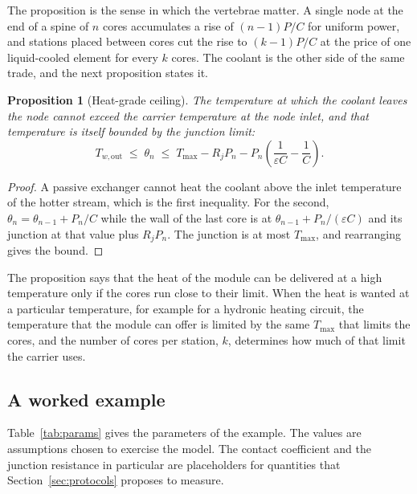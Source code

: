 \documentclass[11pt]{article}
\theoremstyle{definition}
\theoremstyle{plain}
\newtheorem{proposition}{Proposition}[section]
\theoremstyle{remark}
\begin{document}
The proposition is the sense in which the vertebrae matter. A single node at the end of a spine of $n$ cores accumulates a rise of $(n-1)P/C$ for uniform power, and stations placed between cores cut the rise to $(k-1)P/C$ at the price of one liquid-cooled element for every $k$ cores. The coolant is the other side of the same trade, and the next proposition states it.

\begin{proposition}[Heat-grade ceiling]\label{prop:grade}
The temperature at which the coolant leaves the node cannot exceed the carrier temperature at the node inlet, and that temperature is itself bounded by the junction limit:
\[
T_{w,\mathrm{out}}\;\le\;\theta_n\;\le\;T_{\max}-R_jP_n-P_n\!\left(\frac{1}{\varepsilon C}-\frac1C\right).
\]
\end{proposition}
\begin{proof}
A passive exchanger cannot heat the coolant above the inlet temperature of the hotter stream, which is the first inequality. For the second, $\theta_n=\theta_{n-1}+P_n/C$ while the wall of the last core is at $\theta_{n-1}+P_n/(\varepsilon C)$ and its junction at that value plus $R_jP_n$. The junction is at most $T_{\max}$, and rearranging gives the bound.
\end{proof}

The proposition says that the heat of the module can be delivered at a high temperature only if the cores run close to their limit. When the heat is wanted at a particular temperature, for example for a hydronic heating circuit, the temperature that the module can offer is limited by the same $T_{\max}$ that limits the cores, and the number of cores per station, $k$, determines how much of that limit the carrier uses.

\subsection{A worked example}
\label{sec:example}

Table~\ref{tab:params} gives the parameters of the example. The values are assumptions chosen to exercise the model. The contact coefficient and the junction resistance in particular are placeholders for quantities that Section~\ref{sec:protocols} proposes to measure.
\end{document}
